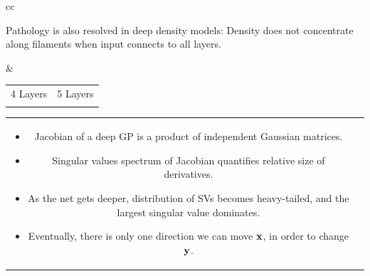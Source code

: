 \documentclass[portrait,a0b,final,a4resizeable]{include/a0poster}
\makeatletter
\newlength{\nonHumbleHeight}
\def\@humbleformat#1{{\settoheight{\nonHumbleHeight}{#1}\resizebox{!}{0.94\nonHumbleHeight}{#1}}}%
\def\humble#1{\@humbleformat{#1}}%
\newcommand{\gp}{{\humble GP}}
\makeatother
\begin{document}
\begin{poster}
\begin{multicols}{2}
\begin{tabular}{cc}
\begin{minipage}[c]{0.5\columnwidth}

Pathology is also resolved in deep density models:  Density does not concentrate along filaments when input connects to all layers.


\end{minipage}
&
\begin{minipage}[c]{0.5\columnwidth}
\centering
\begin{tabular}{cc}
 4 Layers & 5 Layers \\
\gpdrawboxcon{4} &
\gpdrawboxcon{5}
\end{tabular}
\end{minipage}
\end{tabular}






\newcommand{\spectrumpic}[1]{
\texttt{[image: ../figures/spectrum/layer-\#1]}} 


\begin{tabular}{cc}
\begin{minipage}[c]{0.73\columnwidth}


\begin{itemize}
\item Jacobian of a deep GP is a product of independent Gaussian matrices.
\item Singular values spectrum of Jacobian quantifies relative size of derivatives.
\item As the net gets deeper, distribution of SVs becomes heavy-tailed, and the largest singular value dominates.
\item Eventually, there is only one direction we can move ${\bf{x}}$, in order to change ${\bf{y}}$.
\end{itemize}


\end{minipage}
\end{tabular}
\end{multicols}
\end{poster}
\end{document}
